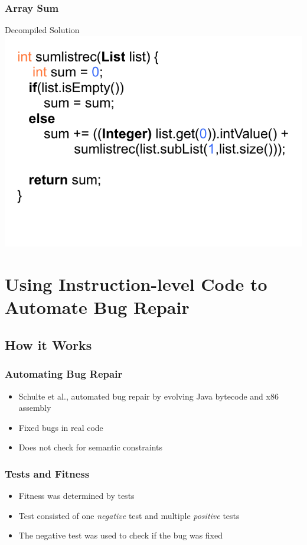 \documentclass{beamer}
\begin{document}
\begin{frame}
\frametitle{Array Sum}
\begin{center}
Decompiled Solution
\\
\includegraphics[height=.9\textheight]{Illustrations/solutionRec.pdf}
\end{center}


\end{frame}


\section[Evolving Assembly]{Using Instruction-level Code to Automate Bug Repair}

\subsection{How it Works}
\begin{frame}
  \frametitle{Automating Bug Repair}
  \begin{itemize}
  \item Schulte et al., automated bug repair by evolving Java bytecode and x86 assembly
  \item Fixed bugs in real code
  \item Does not check for semantic constraints 


  \end{itemize}
\end{frame}

\begin{frame}
\frametitle{Tests and Fitness}
\begin{itemize}
	\item Fitness was determined by tests
	\item Test consisted of one \textit{negative} test and multiple \textit{positive} tests
	\item The negative test was used to check if the bug was fixed
\end{itemize}
\end{frame}
\end{document}
